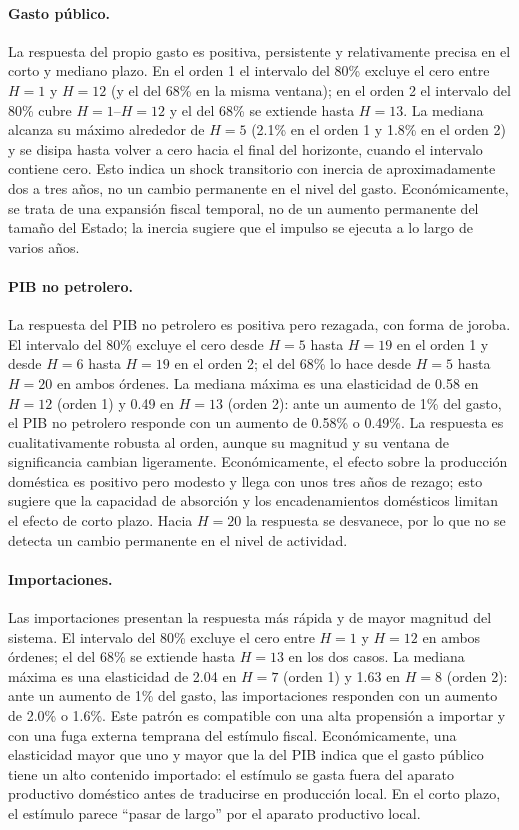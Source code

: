 \documentclass[11pt,a4paper]{article}
\begin{document}
\paragraph{Gasto público.}
La respuesta del propio gasto es positiva, persistente y relativamente precisa en
el corto y mediano plazo. En el orden 1 el intervalo del 80\% excluye el cero
entre $H{=}1$ y $H{=}12$ (y el del 68\% en la misma ventana); en el orden 2 el
intervalo del 80\% cubre $H{=}1$--$H{=}12$ y el del 68\% se extiende hasta
$H{=}13$. La mediana alcanza su máximo alrededor de $H{=}5$ (2.1\% en el orden 1 y
1.8\% en el orden 2) y se disipa hasta volver a cero hacia el final del
horizonte, cuando el intervalo contiene cero. Esto indica un shock transitorio con inercia de aproximadamente dos a tres
años, no un cambio permanente en el nivel del gasto. Económicamente, se trata de
una expansión fiscal temporal, no de un aumento permanente del tamaño del
Estado; la inercia sugiere que el impulso se ejecuta a lo largo de varios años.

\paragraph{PIB no petrolero.}
La respuesta del PIB no petrolero es positiva pero rezagada, con forma de joroba.
El intervalo del 80\% excluye el cero desde $H{=}5$ hasta $H{=}19$ en el orden 1
y desde $H{=}6$ hasta $H{=}19$ en el orden 2; el del 68\% lo hace desde $H{=}5$
hasta $H{=}20$ en ambos órdenes. La mediana máxima es una elasticidad de 0.58 en $H{=}12$ (orden 1) y 0.49 en
$H{=}13$ (orden 2): ante un aumento de 1\% del gasto, el PIB no petrolero
responde con un aumento de 0.58\% o 0.49\%. La respuesta es cualitativamente
robusta al orden, aunque su magnitud y su ventana de significancia cambian
ligeramente. Económicamente, el efecto sobre la producción doméstica es positivo
pero modesto y llega con unos tres años de rezago; esto sugiere que la capacidad
de absorción y los encadenamientos domésticos limitan el efecto de corto plazo.
Hacia $H{=}20$ la respuesta se desvanece, por lo que no se detecta un cambio
permanente en el nivel de actividad.

\paragraph{Importaciones.}
Las importaciones presentan la respuesta más rápida y de mayor magnitud del
sistema.
El intervalo del 80\% excluye el cero entre $H{=}1$ y $H{=}12$ en ambos
órdenes; el del 68\% se extiende hasta $H{=}13$ en los dos casos. La mediana máxima es una elasticidad de 2.04 en $H{=}7$ (orden 1) y 1.63 en
$H{=}8$ (orden 2): ante un aumento de 1\% del gasto, las importaciones responden
con un aumento de 2.0\% o 1.6\%. Este patrón es compatible con una alta
propensión a importar y con una fuga externa temprana del estímulo fiscal.
Económicamente, una elasticidad mayor que uno y mayor que la del PIB indica que
el gasto público tiene un alto contenido importado: el estímulo se gasta fuera
del aparato productivo doméstico antes de traducirse en producción local. En el
corto plazo, el estímulo parece ``pasar de largo'' por el aparato productivo
local.
\end{document}
